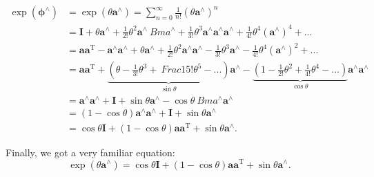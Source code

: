 \begin{align*}
\exp \left( {{\boldsymbol{\phi} ^ \wedge }} \right) &= \exp \left( {\theta {\mathbf{a}^ \wedge }} \right) = \sum\limits_ {n = 0}^\infty {\frac{1}{{n!}}{{\left( {\theta {\mathbf{a}^ \wedge }} \right)}^n}} \\
&= \mathbf{I} + \theta {\mathbf{a}^ \wedge } + \frac{1}{{2!}}{\theta ^2}{\mathbf{a}^ \wedge }{\ Bm{a}^ \wedge } + \frac{1}{{3!}}{\theta ^3}{\mathbf{a}^ \wedge }{\mathbf{a}^ \wedge }{\mathbf{ a}^ \wedge } + \frac{1}{{4!}}{\theta ^4}{\left( {{\mathbf{a}^ \wedge }} \right)^4} + ... \\
&= \mathbf{a} {\mathbf{a}^\mathrm{T}} - {\mathbf{a}^ \wedge }{\mathbf{a}^ \wedge } + \theta {\mathbf{a} ^ \wedge } + \frac{1}{{2!}}\theta^2 {\mathbf{a}^ \wedge }{\mathbf{a}^ \wedge } - \frac{1}{{3! }}{\theta ^3}{\mathbf{a}^ \wedge } - \frac{1}{{4!}}{\theta ^4}{\left( {{\mathbf{a}^ \wedge }} \right)^2} + ...\\
&= \mathbf{a}{\mathbf{a}^\mathrm{T}} + \underbrace{\left( {\theta - \frac{1}{{3!}}{\theta ^3} + \ Frac{1}{{5!}}{\theta ^5} - ...} \right)}_{\sin \theta} {\mathbf{a}^ \wedge } - \underbrace{\left( { 1 - \frac{1}{{2!}}{\theta ^2} + \frac{1}{{4!}}{\theta ^4} - ...} \right)}_{\cos \theta}{\mathbf{a}^ \wedge }{\mathbf{a}^ \wedge }\\
&= {\mathbf{a}^ \wedge }{\mathbf{a}^ \wedge } + \mathbf{I} + \sin \theta {\mathbf{a}^ \wedge } - \cos \theta {\ Bm{a}^ \wedge }{\mathbf{a}^ \wedge }\\
&= (1 - \cos \theta ){\mathbf{a}^ \wedge }{\mathbf{a}^ \wedge } + \mathbf{I} + \sin \theta {\mathbf{a}^ \wedge }\\
&= \cos \theta \mathbf{I} + (1 - \cos \theta )\mathbf{a}{\mathbf{a}^\mathrm{T}} + \sin \theta {\mathbf{a}^ \wedge }.
\end{align*}

Finally, we got a very familiar equation:
\begin{equation}
\exp( \theta \mathbf{a}^\wedge ) = \cos \theta \mathbf{I} + (1 - \cos \theta )\mathbf{a}{\mathbf{a}^\mathrm{T} } + \sin \theta {\mathbf{a}^ \wedge }.
\end{equation}

